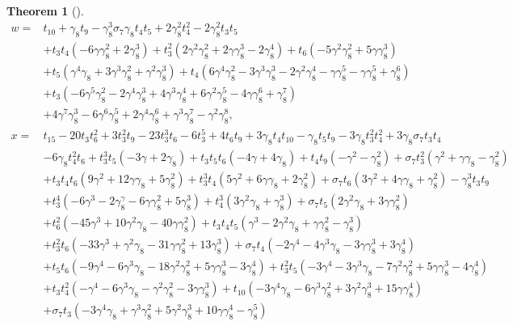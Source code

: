 \documentclass{article}
\theoremstyle{plain}
\newtheorem{thm}{Theorem}[section]
\theoremstyle{definition}
\numberwithin{thm}{section}
\begin{document}
\begin{thm}[\cite{nakagawaE8}]
\begin{align*}
				w=&t_{10}+\gamma_8t_9-\gamma_8^3\sigma_7\gamma_8t_4t_5+2\gamma_8^2t_4^2-2\gamma_8^2t_3t_5 \\
					&+t_3t_4(-6\gamma\gamma_8^2+2\gamma_8^3)+t_3^2(2\gamma^2\gamma_8^2+2\gamma\gamma_8^3-2\gamma_8^4)+t_6(-5\gamma^2\gamma_8^2+5\gamma\gamma_8^3) \\
					&+t_5(\gamma^4\gamma_8+3\gamma^3\gamma_8^2+\gamma^2\gamma_8^3)+t_4(6\gamma^4\gamma_8^2-3\gamma^3\gamma_8^3-2\gamma^2\gamma_8^4-\gamma\gamma_8^5
					 -\gamma\gamma_8^5+\gamma_8^6) \\
					&+t_3(-6\gamma^5\gamma_8^2-2\gamma^4\gamma_8^3+4\gamma^3\gamma_8^4+6\gamma^2\gamma_8^5-4\gamma\gamma_8^6+\gamma_8^7) \\
					&+4\gamma^7\gamma_8^3-6\gamma^6\gamma_8^5+2\gamma^4\gamma_8^6+\gamma^3\gamma_8^7-\gamma^2\gamma_8^8, \\
				x=&t_{15}-20t_3t_6^2+3t_3^2t_9-23t_3^3t_6-6t_3^5+4t_6t_9+3\gamma_8t_4t_{10}-\gamma_8t_5t_9-3\gamma_8t_3^2t_4^2+3\gamma_8\sigma_7t_3t_4 \\
					&-6\gamma_8t_4^2t_6+t_3^3t_5(-3\gamma+2\gamma_8)+t_3t_5t_6(-4\gamma+4\gamma_8)+t_4t_9(-\gamma^2-\gamma_8^2)+\sigma_7t_3^2(\gamma^2+\gamma\gamma_8-\gamma_8^2) \\
					&+t_3t_4t_6(9\gamma^2+12\gamma\gamma_8+5\gamma_8^2)+t_3^3t_4(5\gamma^2+6\gamma\gamma_8+2\gamma_8^2)+\sigma_7t_6(3\gamma^2+4\gamma\gamma_8+\gamma_8^2)
					-\gamma_8^3t_3t_9 \\
					&+t_3^4(-6\gamma^3-2\gamma^\gamma_8-6\gamma\gamma_8^2+5\gamma_8^3)+t_4^3(3\gamma^2\gamma_8+\gamma_8^3)+\sigma_7t_5(2\gamma^2\gamma_8+3\gamma\gamma_8^2) \\
					&+t_6^2(-45\gamma^3+10\gamma^2\gamma_8-40\gamma\gamma_8^2)+t_3t_4t_5(\gamma^3-2\gamma^2\gamma_8+\gamma\gamma_8^2-\gamma_8^3) \\
					&+t_3^2t_6(-33\gamma^3+\gamma^2\gamma_8-31\gamma\gamma_8^2+13\gamma_8^3)+\sigma_7t_4(-2\gamma^4-4\gamma^3\gamma_8-3\gamma\gamma_8^3+3\gamma_8^4) \\
					&+t_5t_6(-9\gamma^4-6\gamma^3\gamma_8-18\gamma^2\gamma_8^2+5\gamma\gamma_8^3-3\gamma_8^4)+t_3^2t_5(-3\gamma^4-3\gamma^3\gamma_8-7\gamma^2\gamma_8^2
					 +5\gamma\gamma_8^3-4\gamma_8^4) \\
					&+t_3t_4^2(-\gamma^4-6\gamma^3\gamma_8-\gamma^2\gamma_8^2-3\gamma\gamma_8^3)
					 +t_{10}(-3\gamma^4\gamma_8-6\gamma^3\gamma_8^2+3\gamma^2\gamma_8^3+15\gamma\gamma_8^4) \\
					&+\sigma_7t_3(-3\gamma^4\gamma_8+\gamma^3\gamma_8^2+5\gamma^2\gamma_8^3+10\gamma\gamma_8^4-\gamma_8^5) \\

\end{align*}
\end{thm}
\end{document}
